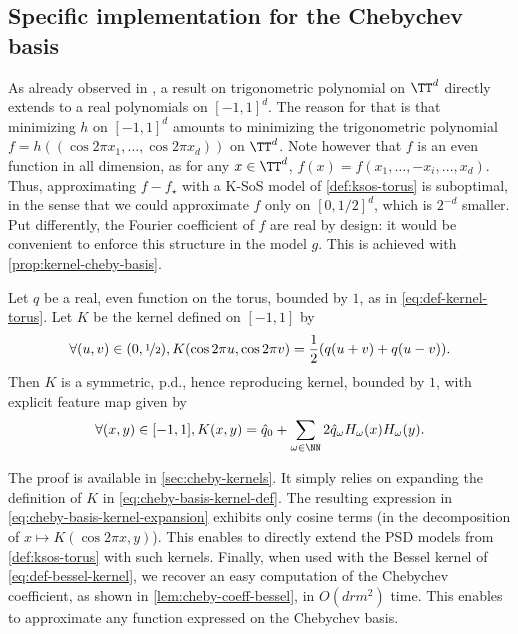 \documentclass{article}
\begin{document}
\subsection{Specific implementation for the Chebychev basis}
\label{sec:cheby-basis-impl}

As already observed in \cite{bachExponentialConvergenceSumofsquares2023}, a result on trigonometric polynomial on $\TT^d$ directly extends to a real polynomials on $[-1, 1]^d$. The reason for that is that minimizing $h$ on $[-1, 1]^d$ amounts to minimizing the trigonometric polynomial $f = h((\cos 2\pi x_1, \dots, \cos 2\pi x_d))$ on $\TT^d$. Note however that $f$ is an even function in all dimension, as for any $x \in \TT^d$, $f(x) = f(x_1, \dots, -x_i, \dots, x_d)$. Thus, approximating $f - f_\star$ with a K-SoS model of \cref{def:ksos-torus} is suboptimal, in the sense that we could approximate $f$ only on $[0, 1/2]^d$, which is $2^{-d}$ smaller. Put differently, the Fourier coefficient of $f$ are real by design: it would be convenient to enforce this structure in the model $g$. This is achieved with \cref{prop:kernel-cheby-basis}.

\begin{proposition}\label{prop:kernel-cheby-basis}
  Let $q$ be a real, even function on the torus, bounded by $1$, as in \cref{eq:def-kernel-torus}. Let $K$ be the kernel defined on $[-1, 1]$ by
  \begin{equation}\label{eq:cheby-basis-kernel-def}
    \forall (u, v) \in (0, \nicefrac12), K(\cos 2\pi u, \cos 2\pi v) = \frac{1}{2}(q(u + v) + q(u - v)).
  \end{equation}
  Then $K$ is a symmetric, p.d., hence reproducing kernel, bounded by $1$, with explicit feature map given by
  \begin{equation}\label{eq:cheby-basis-kernel-expansion}
    \forall (x, y) \in [-1, 1], K(x, y) = \hat{q}_0 + \sum_{\omega \in \NN} 2\hat{q}_\omega H_\omega(x) H_\omega(y).
  \end{equation}
\end{proposition}

The proof is available in \cref{sec:cheby-kernels}. It simply relies on expanding the definition of $K$ in \cref{eq:cheby-basis-kernel-def}. The resulting expression in \cref{eq:cheby-basis-kernel-expansion} exhibits only cosine terms (in the decomposition of $x \mapsto K(\cos 2\pi x, y)$). This enables to directly extend the PSD models from \cref{def:ksos-torus} with such kernels.
Finally, when used with the Bessel kernel of \cref{eq:def-bessel-kernel}, we recover an easy computation of the Chebychev coefficient, as shown in \cref{lem:cheby-coeff-bessel}, in $O(d r m^2)$ time. This enables to approximate any function expressed on the Chebychev basis.
\end{document}

